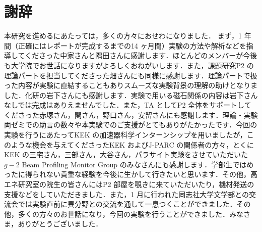 \section*{謝辞}

本研究を進めるにあたっては，多くの方々におせわになりました．
まず，1 年間（正確にはレポートが完成するまでの14 ヶ月間）実験の方法や解析などを指導してくださった中家さんと隅田さんに感謝します．ほとんどのメンバーが今後も大学院でお世話になりますがよろしくおねがいします．また，課題研究P2 の理論パートを担当してくださった畑さんにも同様に感謝します．理論パートで扱った内容が実験に直結することもありスムーズな実験背景の理解の助けとなりました．化研の岩下さんにも感謝します．実験で用いる磁石関係の内容は岩下さんなしでは完成はありえませんでした．また，TA としてP2 全体をサポートしてくださった赤塚さん，関さん，野口さん，安留さんにも感謝します．理論・実験両ゼミでの助言の数々や本実験でのご支援がとてもありがたかったです．今回の実験を行うにあたってKEK の加速器科学インターンシップを用いましたが，このような機会を与えてくださったKEK およびJ-PARC の関係者の方々，とくにKEK の三宅さん，三部さん，大谷さん，パラサイト実験をさせていただいた$g-2$ Beam Profiling Monitor Group のみなさんにも感謝します．学部生ではめったに得られない貴重な経験を今後に生かして行きたいと思います．その他，高エネ研究室の院生の皆さんにはP2 部屋を覗きに来ていただいたり，機材発送の支援などをしていただきました．また，1 月に行われた同志社大学文学部との交流会では実験直前に異分野との交流を通して一息つくことができました．その他，多くの方々のお世話になり，今回の実験を行うことができました．みなさま，ありがとうございました．